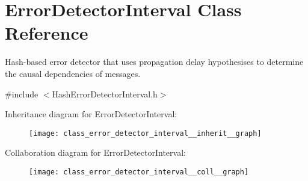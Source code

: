 \hypertarget{class_error_detector_interval}{}\section{Error\+Detector\+Interval Class Reference}
\label{class_error_detector_interval}


Hash-\/based error detector that uses propagation delay hypothesises to determine the causal dependencies of messages.  




{\ttfamily \#include $<$Hash\+Error\+Detector\+Interval.\+h$>$}



Inheritance diagram for Error\+Detector\+Interval\+:
\nopagebreak
\begin{figure}[H]
\begin{center}
\leavevmode
\texttt{[image: class\_error\_detector\_interval\_\_inherit\_\_graph]}
\end{center}
\end{figure}


Collaboration diagram for Error\+Detector\+Interval\+:
\nopagebreak
\begin{figure}[H]
\begin{center}
\leavevmode
\texttt{[image: class\_error\_detector\_interval\_\_coll\_\_graph]}
\end{center}
\end{figure}
